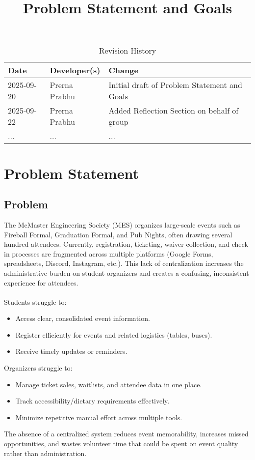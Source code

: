 \documentclass{article}
\title{Problem Statement and Goals\\\progname}
\author{\authname}
\date{}
\begin{document}
\sloppy

\maketitle

\begin{table}[hp]
\caption{Revision History} \label{TblRevisionHistory}
\begin{tabularx}{\textwidth}{llX}
\toprule
\textbf{Date} & \textbf{Developer(s)} & \textbf{Change}\\
\midrule
2025-09-20 & Prerna Prabhu  & Initial draft of Problem Statement and Goals\\
2025-09-22 & Prerna Prabhu & Added Reflection Section on behalf of group\\
... & ... & ...\\
\bottomrule
\end{tabularx}
\end{table}

\section{Problem Statement}

\subsection{Problem}
The McMaster Engineering Society (MES) organizes large-scale events such as Fireball Formal, Graduation Formal,
 and Pub Nights, often drawing several hundred attendees. Currently, registration, ticketing, waiver collection,
 and check-in processes are fragmented across multiple platforms (Google Forms, spreadsheets, Discord, Instagram,
 etc.). This lack of centralization increases the administrative burden on student organizers and creates a
 confusing, inconsistent experience for attendees.
\\
\\Students struggle to:
\begin{itemize}
    \item Access clear, consolidated event information.
    \item Register efficiently for events and related logistics (tables, buses).
    \item Receive timely updates or reminders.
\end{itemize}
Organizers struggle to:
\begin{itemize}
    \item Manage ticket sales, waitlists, and attendee data in one place.
    \item Track accessibility/dietary requirements effectively.
    \item Minimize repetitive manual effort across multiple tools.
\end{itemize}
The absence of a centralized system reduces event memorability, increases missed opportunities, and 
wastes volunteer time that could be spent on event quality rather than administration.
\end{document}
